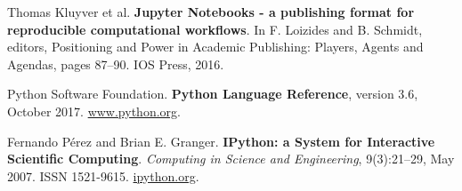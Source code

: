 \documentclass[runningheads]{llncs}
\begin{document}
%
%
% 
% 
%
\begin{thebibliography}{8}
Thomas Kluyver et al.
\textbf{Jupyter Notebooks - a publishing format for reproducible computational workflows}.
In F. Loizides and B. Schmidt, editors, Positioning and Power in Academic Publishing: Players, Agents and Agendas, pages 87–90. IOS Press, 2016.

Python Software Foundation.
\textbf{Python Language Reference}, version 3.6, October 2017. \url{www.python.org}.

Fernando Pérez and Brian E. Granger.
\textbf{IPython: a System for Interactive Scientific Computing}.
\emph{Computing in Science and Engineering}, 9(3):21–29, May 2007. ISSN 1521-9615. \url{ipython.org}.
\end{thebibliography}
\end{document}
